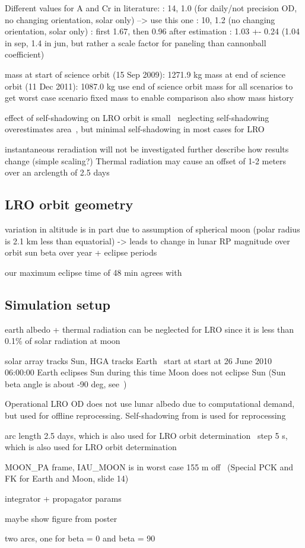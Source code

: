 Different values for A and Cr in literature:
\cite{Nicholson2010}: 14, 1.0 (for daily/not precision OD, no changing orientation, solar only) --> use this one
\cite{Bauer2016}: 10, 1.2 (no changing orientation, solar only)
\cite{Slojkowski2015}: first 1.67, then 0.96 after estimation
\cite{Mazarico2018}: 1.03 +- 0.24 (1.04 in sep, 1.4 in jun, but rather a scale factor for paneling than cannonball coefficient)

mass at start of science orbit (15 Sep 2009): 1271.9 kg
mass at end of science orbit (11 Dec 2011): 1087.0 kg
use end of science orbit mass for all scenarios to get worst case scenario
fixed mass to enable comparison
also show mass history

effect of self-shadowing on LRO orbit is small~\cite{Loecher2018}
neglecting self-shadowing overestimates area~\cite{Mazarico2009}, but minimal self-shadowing in most cases for LRO~\cite{Slojkowski2015}

instantaneous reradiation
will not be investigated further
describe how results change (simple scaling?)
Thermal radiation may cause an offset of 1-2 meters over an arclength of 2.5 days~\cite{Bauer2016}



\subsection{LRO orbit geometry}
variation in altitude is in part due to assumption of spherical moon (polar radius is 2.1 km less than equatorial) -> leads to change in lunar RP magnitude over orbit
sun beta over year + eclipse periods

our maximum eclipse time of 48 min agrees with \cite{Tooley2010}



\subsection{Simulation setup}

earth albedo + thermal radiation can be neglected for LRO since it is less than 0.1\% of solar radiation at moon

solar array tracks Sun, HGA tracks Earth~\cite{Tooley2010}
start at start at 26 June 2010 06:00:00
Earth eclipses Sun during this time
Moon does not eclipse Sun (Sun beta angle is about -90 deg, see~\cite{Tooley2010})


Operational LRO OD does not use lunar albedo due to computational demand, but used for offline reprocessing.
Self-shadowing from \citeauthor{Mazarico2009} is used for reprocessing~\cite{Nicholson2010}

arc length 2.5 days, which is also used for LRO orbit determination~\cite{Mazarico2011}
step 5 s, which is also used for LRO orbit determination~\cite{Mazarico2018}

MOON\_PA frame, IAU\_MOON is in worst case 155 m off~\cite{NAIF2020} (Special PCK and FK for Earth and Moon, slide 14)

integrator + propagator params


maybe show figure from poster


two arcs, one for beta = 0 and beta = 90
